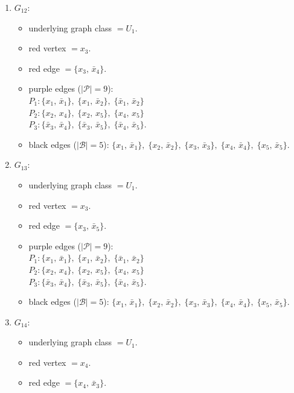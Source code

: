 \begin{enumerate}[leftmargin=*]
\begin{itemize}[leftmargin=*]
\end{itemize}
\item $G_{12}$:
\begin{itemize}[leftmargin=*]
\item underlying graph class $= U_1$.
\item red vertex $= x_{3}$.
\item red edge $= \{x_{3},\,\bar{x}_{4}\}$.
\item purple edges ($|\mathcal{P}|=9$):\mbox{}\\
$P_{1}: \{x_{1},\,\bar{x}_{1}\},\; \{x_{1},\,\bar{x}_{2}\},\; \{\bar{x}_{1},\,\bar{x}_{2}\}$\\
$P_{2}: \{x_{2},\,x_{4}\},\; \{x_{2},\,x_{5}\},\; \{x_{4},\,x_{5}\}$\\
$P_{3}: \{\bar{x}_{3},\,\bar{x}_{4}\},\; \{\bar{x}_{3},\,\bar{x}_{5}\},\; \{\bar{x}_{4},\,\bar{x}_{5}\}$.
\item black edges ($|\mathcal{B}|=5$): $\{x_{1},\,\bar{x}_{1}\},\; \{x_{2},\,\bar{x}_{2}\},\; \{x_{3},\,\bar{x}_{3}\},\; \{x_{4},\,\bar{x}_{4}\},\; \{x_{5},\,\bar{x}_{5}\}$.
\end{itemize}
\item $G_{13}$:
\begin{itemize}[leftmargin=*]
\item underlying graph class $= U_1$.
\item red vertex $= x_{3}$.
\item red edge $= \{x_{3},\,\bar{x}_{5}\}$.
\item purple edges ($|\mathcal{P}|=9$):\mbox{}\\
$P_{1}: \{x_{1},\,\bar{x}_{1}\},\; \{x_{1},\,\bar{x}_{2}\},\; \{\bar{x}_{1},\,\bar{x}_{2}\}$\\
$P_{2}: \{x_{2},\,x_{4}\},\; \{x_{2},\,x_{5}\},\; \{x_{4},\,x_{5}\}$\\
$P_{3}: \{\bar{x}_{3},\,\bar{x}_{4}\},\; \{\bar{x}_{3},\,\bar{x}_{5}\},\; \{\bar{x}_{4},\,\bar{x}_{5}\}$.
\item black edges ($|\mathcal{B}|=5$): $\{x_{1},\,\bar{x}_{1}\},\; \{x_{2},\,\bar{x}_{2}\},\; \{x_{3},\,\bar{x}_{3}\},\; \{x_{4},\,\bar{x}_{4}\},\; \{x_{5},\,\bar{x}_{5}\}$.
\end{itemize}
\item $G_{14}$:
\begin{itemize}[leftmargin=*]
\item underlying graph class $= U_1$.
\item red vertex $= x_{4}$.
\item red edge $= \{x_{4},\,\bar{x}_{3}\}$.

\end{itemize}
\end{enumerate}
